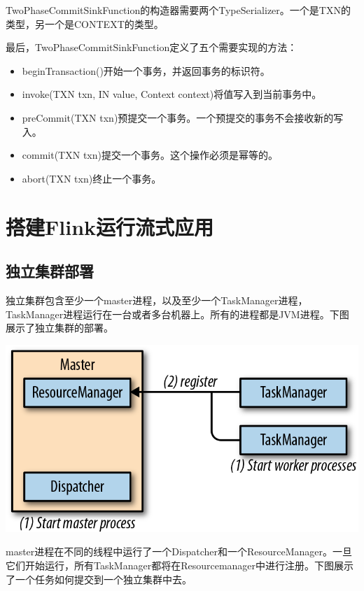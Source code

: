 \documentclass[cn,11pt,chinese]{elegantbook}
\providecommand{\tightlist}{%
  \setlength{\itemsep}{0pt}\setlength{\parskip}{0pt}}
\begin{document}
TwoPhaseCommitSinkFunction的构造器需要两个TypeSerializer。一个是TXN的类型，另一个是CONTEXT的类型。

最后，TwoPhaseCommitSinkFunction定义了五个需要实现的方法：

\begin{itemize}
\tightlist
\item
  beginTransaction()开始一个事务，并返回事务的标识符。
\item
  invoke(TXN txn, IN value, Context context)将值写入到当前事务中。
\item
  preCommit(TXN txn)预提交一个事务。一个预提交的事务不会接收新的写入。
\item
  commit(TXN txn)提交一个事务。这个操作必须是幂等的。
\item
  abort(TXN txn)终止一个事务。
\end{itemize}

\hypertarget{ux642dux5efaflinkux8fd0ux884cux6d41ux5f0fux5e94ux7528}{%
\chapter{搭建Flink运行流式应用}\label{ux642dux5efaflinkux8fd0ux884cux6d41ux5f0fux5e94ux7528}}

\hypertarget{ux72ecux7acbux96c6ux7fa4ux90e8ux7f72}{%
\section{独立集群部署}\label{ux72ecux7acbux96c6ux7fa4ux90e8ux7f72}}

独立集群包含至少一个master进程，以及至少一个TaskManager进程，TaskManager进程运行在一台或者多台机器上。所有的进程都是JVM进程。下图展示了独立集群的部署。

\includegraphics{images/spaf_0901.png}

master进程在不同的线程中运行了一个Dispatcher和一个ResourceManager。一旦它们开始运行，所有TaskManager都将在Resourcemanager中进行注册。下图展示了一个任务如何提交到一个独立集群中去。
\end{document}
